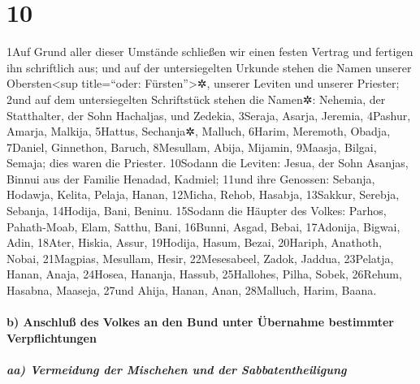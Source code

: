 \hypertarget{section-9}{%
\section{10}\label{section-9}}

1Auf Grund aller dieser Umstände schließen wir einen festen Vertrag und
fertigen ihn schriftlich aus; und auf der untersiegelten Urkunde stehen
die Namen unserer Obersten\textless sup title=``oder:
Fürsten''\textgreater✲, unserer Leviten und unserer Priester; 2und auf
dem untersiegelten Schriftstück stehen die Namen✲: Nehemia, der
Statthalter, der Sohn Hachaljas, und Zedekia, 3Seraja, Asarja, Jeremia,
4Pashur, Amarja, Malkija, 5Hattus, Sechanja✲, Malluch, 6Harim, Meremoth,
Obadja, 7Daniel, Ginnethon, Baruch, 8Mesullam, Abija, Mijamin, 9Maasja,
Bilgai, Semaja; dies waren die Priester. 10Sodann die Leviten: Jesua,
der Sohn Asanjas, Binnui aus der Familie Henadad, Kadmiel; 11und ihre
Genossen: Sebanja, Hodawja, Kelita, Pelaja, Hanan, 12Micha, Rehob,
Hasabja, 13Sakkur, Serebja, Sebanja, 14Hodija, Bani, Beninu. 15Sodann
die Häupter des Volkes: Parhos, Pahath-Moab, Elam, Satthu, Bani,
16Bunni, Asgad, Bebai, 17Adonija, Bigwai, Adin, 18Ater, Hiskia, Assur,
19Hodija, Hasum, Bezai, 20Hariph, Anathoth, Nobai, 21Magpias, Mesullam,
Hesir, 22Mesesabeel, Zadok, Jaddua, 23Pelatja, Hanan, Anaja, 24Hosea,
Hananja, Hassub, 25Hallohes, Pilha, Sobek, 26Rehum, Hasabna, Maaseja,
27und Ahija, Hanan, Anan, 28Malluch, Harim, Baana.

\hypertarget{b-anschluuxdf-des-volkes-an-den-bund-unter-uxfcbernahme-bestimmter-verpflichtungen}{%
\paragraph{b) Anschluß des Volkes an den Bund unter Übernahme bestimmter
Verpflichtungen}\label{b-anschluuxdf-des-volkes-an-den-bund-unter-uxfcbernahme-bestimmter-verpflichtungen}}

\hypertarget{aa-vermeidung-der-mischehen-und-der-sabbatentheiligung}{%
\subparagraph{aa) Vermeidung der Mischehen und der
Sabbatentheiligung}\label{aa-vermeidung-der-mischehen-und-der-sabbatentheiligung}}

